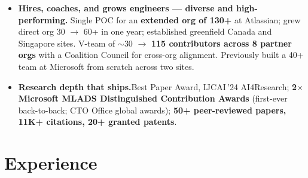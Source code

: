 \documentclass[10.5pt,letterpaper]{article}
\begin{document}
\begin{itemize}
  \item \textbf{Hires, coaches, and grows engineers --- diverse and high-performing.} Single POC for an \textbf{extended org of 130+} at Atlassian; grew direct org 30 $\to$ 60+ in one year; established greenfield Canada and Singapore sites. V-team of $\sim$30 $\to$ \textbf{115 contributors across 8 partner orgs} with a Coalition Council for cross-org alignment. Previously built a 40+ team at Microsoft from scratch across two sites.
  \item \textbf{Research depth that ships.}Best Paper Award, IJCAI\,'24 AI4Research; \textbf{2$\times$ Microsoft MLADS Distinguished Contribution Awards} (first-ever back-to-back; CTO Office global awards); \textbf{50+ peer-reviewed papers, 11K+ citations, 20+ granted patents}.
\end{itemize}

\section*{Experience}
\end{document}

